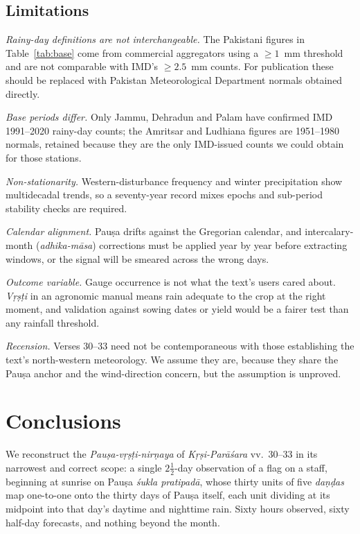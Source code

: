 \documentclass[11pt,a4paper]{article}
\newcommand{\skt}[1]{\textcolor{skt}{\textit{#1}}}
\begin{document}
\subsection{Limitations}
\label{sec:caveats}

\emph{Rainy-day definitions are not interchangeable.} The Pakistani figures in Table~\ref{tab:base} come from commercial aggregators using a $\ge1$~mm threshold and are not comparable with IMD's $\ge2.5$~mm counts. For publication these should be replaced with Pakistan Meteorological Department normals obtained directly.

\emph{Base periods differ.} Only Jammu, Dehradun and Palam have confirmed IMD 1991--2020 rainy-day counts; the Amritsar and Ludhiana figures are 1951--1980 normals, retained because they are the only IMD-issued counts we could obtain for those stations.

\emph{Non-stationarity.} Western-disturbance frequency and winter precipitation show multidecadal trends, so a seventy-year record mixes epochs and sub-period stability checks are required.

\emph{Calendar alignment.} Pauṣa drifts against the Gregorian calendar, and intercalary-month (\skt{adhika-māsa}) corrections must be applied year by year before extracting windows, or the signal will be smeared across the wrong days.

\emph{Outcome variable.} Gauge occurrence is not what the text's users cared about. \skt{Vṛṣṭi} in an agronomic manual means rain adequate to the crop at the right moment, and validation against sowing dates or yield would be a fairer test than any rainfall threshold.

\emph{Recension.} Verses 30--33 need not be contemporaneous with those establishing the text's north-western meteorology. We assume they are, because they share the Pauṣa anchor and the wind-direction concern, but the assumption is unproved.

\section{Conclusions}

We reconstruct the \skt{Pauṣa-vṛṣṭi-nirṇaya} of \skt{Kṛṣi-Parāśara} vv.~30--33 in its narrowest and correct scope: a single $2\tfrac{1}{2}$-day observation of a flag on a staff, beginning at sunrise on Pauṣa \skt{śukla pratipadā}, whose thirty units of five \skt{daṇḍas} map one-to-one onto the thirty days of Pauṣa itself, each unit dividing at its midpoint into that day's daytime and nighttime rain. Sixty hours observed, sixty half-day forecasts, and nothing beyond the month.
\end{document}
